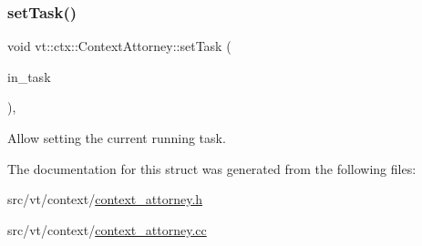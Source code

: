 \subsubsection{\texorpdfstring{set\+Task()}{setTask()}}
{\footnotesize\ttfamily void vt\+::ctx\+::\+Context\+Attorney\+::set\+Task (\begin{DoxyParamCaption}\item[{\hyperlink{structvt_1_1runnable_1_1_runnable_new}{runnable\+::\+Runnable\+New} $\ast$}]{in\+\_\+task }\end{DoxyParamCaption})\hspace{0.3cm}{\ttfamily [static]}, {\ttfamily [private]}}



Allow setting the current running task. 



The documentation for this struct was generated from the following files\+:\begin{DoxyCompactItemize}
\item 
src/vt/context/\hyperlink{context__attorney_8h}{context\+\_\+attorney.\+h}\item 
src/vt/context/\hyperlink{context__attorney_8cc}{context\+\_\+attorney.\+cc}\end{DoxyCompactItemize}
